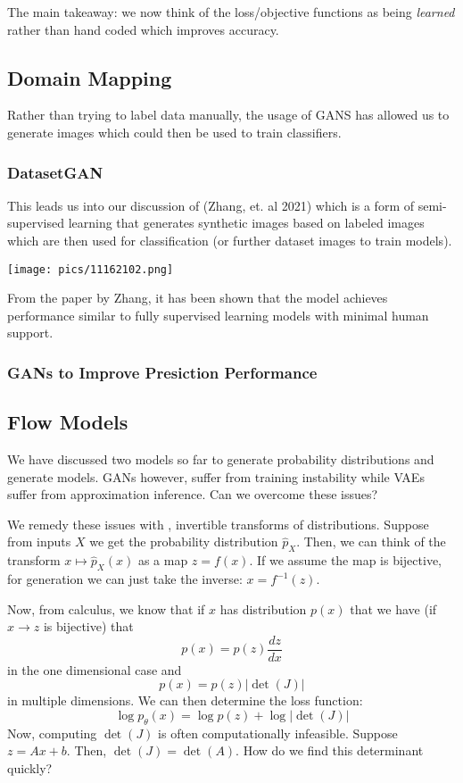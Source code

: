 \documentclass[11pt]{scrartcl}
\begin{document}
The main takeaway: we now think of the loss/objective functions as being \textit{learned} rather than hand coded which improves accuracy.

\subsection{Domain Mapping}

Rather than trying to label data manually, the usage of GANS has allowed us to generate images which could then be used to train classifiers.

\subsubsection{DatasetGAN}
This leads us into our discussion of  (Zhang, et. al 2021) which is a form of semi-supervised learning that generates synthetic images based on labeled images which are then used for classification (or further dataset images to train models).
\begin{center}
    \texttt{[image: pics/11162102.png]}
\end{center}
From the paper by Zhang, it has been shown that the model achieves performance similar to fully supervised learning models with minimal human support.

\subsubsection{GANs to Improve Presiction Performance}

\subsection{Flow Models}
We have discussed two models so far to generate probability distributions and generate models. GANs however, suffer from training instability while VAEs suffer from approximation inference. Can we overcome these issues? 

We remedy these issues with , invertible transforms of distributions. Suppose from inputs $X$ we get the probability distribution $\hat{p}_X$. Then, we can think of the transform $x \mapsto \hat{p}_X(x)$ as a map $z=f(x)$. If we assume the map is bijective, for generation we can just take the inverse: $x=f^{-1}(z)$.

Now, from calculus, we know that if $x$ has distribution $p(x)$ that we have (if $x \to z$ is bijective) that $$p(x)=p(z)\frac{dz}{dx}$$ in the one dimensional case and $$p(x)=p(z)|\det(J)|$$ in multiple dimensions. We can then determine the loss function: 
$$\log{p_\theta(x)}=\log{p(z)}+\log|\det(J)|$$
Now, computing $\det(J)$ is often computationally infeasible. Suppose $z=Ax+b$. Then, $\det(J)=\det(A)$. How do we find this determinant quickly? 
\end{document}
